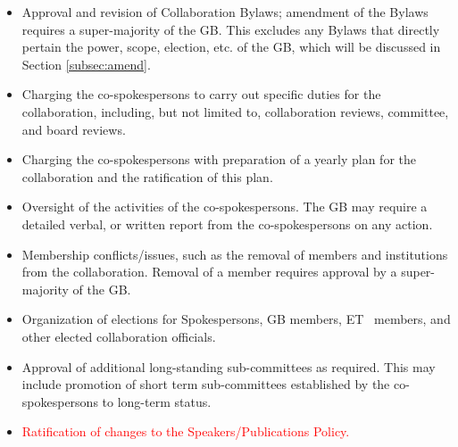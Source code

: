 \documentclass[12pt]{article}
\newcommand{\exec}{{Executive Team}}
\newcommand{\shorte}{{ET }}  %
\begin{document}
\begin{itemize}
\item Approval and revision of Collaboration Bylaws; amendment of the Bylaws requires a super-majority of the GB. This excludes any Bylaws that directly pertain the power, scope, election, etc. of the GB, which will be discussed in Section \ref{subsec:amend}.


\item Charging the co-spokespersons to carry out specific duties for the collaboration, including, but not limited to, collaboration reviews, committee, and board reviews. 

\item Charging the co-spokespersons with preparation of a yearly plan for the collaboration and the ratification of this plan. 

\item Oversight of the activities of the co-spokespersons. The GB may require a detailed verbal, or written report from the co-spokespersons on any action. 

\item Membership conflicts/issues, such as the removal of members and institutions from the collaboration. Removal of a member requires approval by a super-majority of the GB.

\item Organization of elections for Spokespersons, GB members, \shorte \ members, and other elected collaboration officials.


\item Approval of additional long-standing sub-committees as required. This may include promotion of short term sub-committees established by the co-spokespersons to long-term status. 

\item \textcolor{red}{Ratification of changes to the Speakers/Publications Policy.}

\end{itemize}
\end{document}
